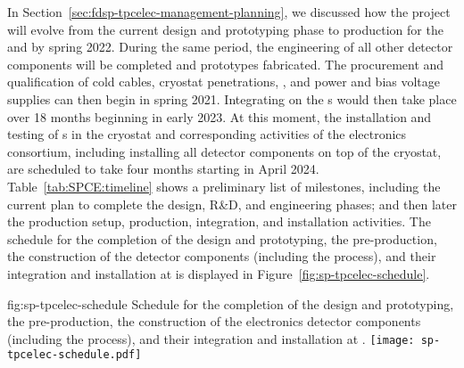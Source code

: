 In Section~\ref{sec:fdsp-tpcelec-management-planning}, we  
discussed how the project will evolve from the current design
and prototyping phase to production for the 
and  by spring 2022. During the same  
period, the engineering of all other detector components will
be completed and prototypes fabricated. The procurement
and qualification of cold cables, cryostat penetrations, ,
and power and bias voltage supplies can then begin in spring 2021.
Integrating  on the s would then
take place over 18 months beginning in early 2023. At
this moment, the installation and testing of s in 
the cryostat and corresponding activities of the  electronics consortium, including installing all 
detector components on top of the cryostat, are scheduled to
take four months starting in April 2024. Table~\ref{tab:SPCE:timeline} shows a preliminary list of 
milestones, including the current plan to complete  
the design, R\&D, and engineering phases; and then later  
the production setup, production, integration,
and installation activities. The schedule for the 
completion of the design and prototyping, the pre-production,
the construction of the detector components (including the
 process), and their integration and installation at
 is displayed in Figure~\ref{fig:sp-tpcelec-schedule}.

\begin{dunefigure}
{fig:sp-tpcelec-schedule}
{Schedule for the completion of the design and prototyping, the pre-production,
the construction of the  electronics detector components (including the
 process), and their integration and installation at .}
\texttt{[image: sp-tpcelec-schedule.pdf]}
\end{dunefigure}

